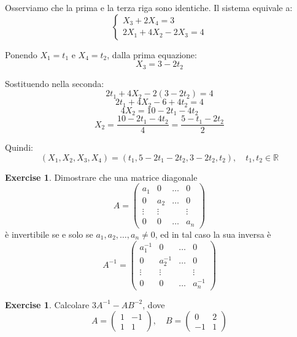 \documentclass{article}
\theoremstyle{plain}
\theoremstyle{definition}
\newtheorem{xca}[exmp]{Exercise}
\theoremstyle{remark}
\begin{document}
\begin{enumerate}
    Osserviamo che la prima e la terza riga sono identiche. Il sistema equivale a:
    \[\begin{cases}
    X_3 + 2X_4 = 3 \\
    2X_1 + 4X_2 - 2X_3 = 4
    \end{cases}\]
    
    Ponendo $X_1 = t_1$ e $X_4 = t_2$, dalla prima equazione:
    \[X_3 = 3 - 2t_2\]
    
    Sostituendo nella seconda:
    \[2t_1 + 4X_2 - 2(3-2t_2) = 4\]
    \[2t_1 + 4X_2 - 6 + 4t_2 = 4\]
    \[4X_2 = 10 - 2t_1 - 4t_2\]
    \[X_2 = \frac{10-2t_1-4t_2}{4} = \frac{5-t_1-2t_2}{2}\]
    
    Quindi:
    \[\boxed{(X_1,X_2,X_3,X_4) = (t_1, 5-2t_1-2t_2, 3-2t_2, t_2),\quad t_1,t_2 \in \mathbb{R}}\]
\end{enumerate}

\vspace{10pt}

\begin{bxthm}
\begin{xca}
    Dimostrare che una matrice diagonale 
    \[A=\begin{pmatrix}
        a_1&0&\dots&0\\
        0&a_2&\dots&0\\
        \vdots&\vdots&&\vdots\\
        0&0&\dots&a_n
    \end{pmatrix}\]
    è invertibile se e solo se $a_1, a_2, \ldots, a_n\neq0$, ed in tal caso la sua inversa è 
    \[A^{-1}=\begin{pmatrix}
        a_1^{-1}&0&\dots&0\\
        0&a_2^{-1}&\dots&0\\
        \vdots&\vdots&&\vdots\\
        0&0&\dots&a_n^{-1}
    \end{pmatrix}\]
\end{xca}
\end{bxthm}

\vspace{10pt}

\begin{bxthm}
\begin{xca}
    Calcolare $3A^{-1}-AB^{-2}$, dove \[A=\begin{pmatrix}
        1&-1\\
        1&1
    \end{pmatrix},\quad B=\begin{pmatrix}
        0&2\\
        -1&1
    \end{pmatrix}\]
\end{xca}
\end{bxthm}
\end{document}
